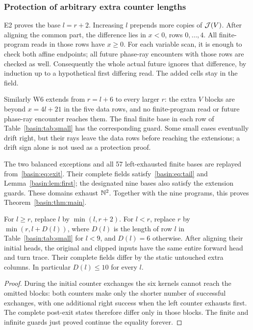 \subsubsection{Protection of arbitrary extra counter lengths}
E2 proves the base $l=r+2$. Increasing $l$ prepends more copies of $\mathcal J(V)$.
After aligning the common part, the difference lies in $x<0$, rows $0,\ldots,4$.
All finite-program reads in those rows have $x\ge0$. For each variable scan,
it is enough to check both affine endpoints; all future phase-ray encounters
with those rows are checked as well. Consequently the whole actual future
ignores that difference, by induction up to a hypothetical first differing
read. The added cells stay in the field.

Similarly W6 extends from $r=l+6$ to every larger $r$: the extra $V$ blocks
are beyond $x=4l+21$ in the five data rows, and no finite-program read or future
phase-ray encounter reaches them. The final finite base in each row of
Table~\ref{basin:tab:small} has the corresponding guard. Some small cases eventually
drift right, but their rays leave the data rows before reaching the extensions;
a drift sign alone is not used as a protection proof.

The two balanced exceptions and all 57 left-exhausted finite bases are replayed
from~\eqref{basin:eq:exit}. Their complete fields satisfy~\eqref{basin:eq:tail} and
Lemma~\ref{basin:lem:first}; the designated nine bases also satisfy the extension
guards. These domains exhaust $\mathbb N^2$. Together with the nine programs, this
proves Theorem~\ref{basin:thm:main}.

\begin{corollary}\label{basin:cor:clip}
For $l\ge r$, replace $l$ by $\min(l,r+2)$. For $l<r$, replace $r$ by
$\min(r,l+D(l))$, where $D(l)$ is the length of row $l$ in
Table~\ref{basin:tab:small} for $l<9$, and $D(l)=6$ otherwise. After aligning their
initial heads, the original and clipped inputs have the same entire forward
head and turn trace. Their complete fields differ by the static untouched
extra columns. In particular $D(l)\le10$ for every $l$.
\end{corollary}
\begin{proof}
During the initial counter exchanges the six kernels cannot reach the omitted
blocks: both counters make only the shorter number of successful exchanges,
with one additional right success when the left counter exhausts first.
The complete post-exit states therefore differ only in those blocks. The
finite and infinite guards just proved continue the equality forever.
\end{proof}

